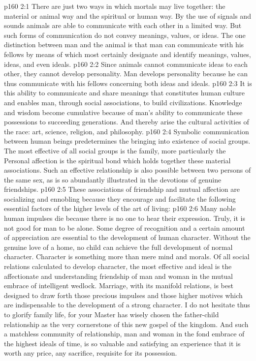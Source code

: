 \vs p160 2:1 There are just two ways in which mortals may live together: the material or animal way and the spiritual or human way. By the use of signals and sounds animals are able to communicate with each other in a limited way. But such forms of communication do not convey meanings, values, or ideas. The one distinction between man and the animal is that man can communicate with his fellows by means of  which most certainly designate and identify meanings, values, ideas, and even ideals.
\vs p160 2:2 Since animals cannot communicate ideas to each other, they cannot develop personality. Man develops personality because he can thus communicate with his fellows concerning both ideas and ideals.
\vs p160 2:3 It is this ability to communicate and share meanings that constitutes human culture and enables man, through social associations, to build civilizations. Knowledge and wisdom become cumulative because of man’s ability to communicate these possessions to succeeding generations. And thereby arise the cultural activities of the race: art, science, religion, and philosophy.
\vs p160 2:4 Symbolic communication between human beings predetermines the bringing into existence of social groups. The most effective of all social groups is the family, more particularly the  Personal affection is the spiritual bond which holds together these material associations. Such an effective relationship is also possible between two persons of the same sex, as is so abundantly illustrated in the devotions of genuine friendships.
\vs p160 2:5 These associations of friendship and mutual affection are socializing and ennobling because they encourage and facilitate the following essential factors of the higher levels of the art of living:
\vs p160 2:6 \bibnobreakspace {} Many noble human impulses die because there is no one to hear their expression. Truly, it is not good for man to be alone. Some degree of recognition and a certain amount of appreciation are essential to the development of human character. Without the genuine love of a home, no child can achieve the full development of normal character. Character is something more than mere mind and morals. Of all social relations calculated to develop character, the most effective and ideal is the affectionate and understanding friendship of man and woman in the mutual embrace of intelligent wedlock. Marriage, with its manifold relations, is best designed to draw forth those precious impulses and those higher motives which are indispensable to the development of a strong character. I do not hesitate thus to glorify family life, for your Master has wisely chosen the father\hyp{}child relationship as the very cornerstone of this new gospel of the kingdom. And such a matchless community of relationship, man and woman in the fond embrace of the highest ideals of time, is so valuable and satisfying an experience that it is worth any price, any sacrifice, requisite for its possession.
